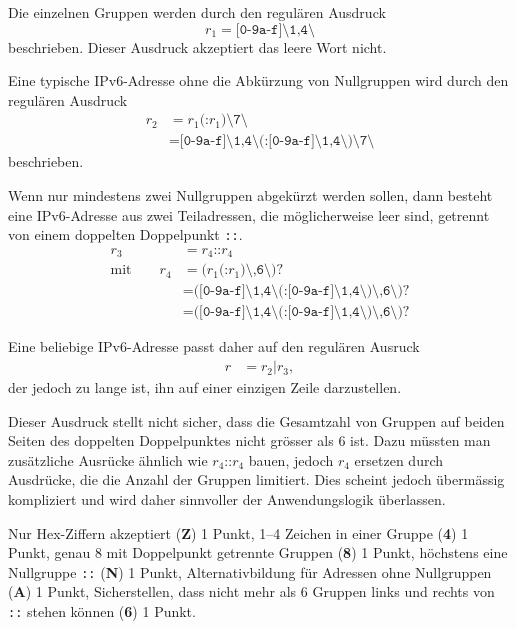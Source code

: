 \begin{loesung}
Die einzelnen Gruppen werden durch den regulären Ausdruck
\[
r_1 = \texttt{[0-9a-f]\char`\{1,4\char`\}}
\]
beschrieben.
Dieser Ausdruck akzeptiert das leere Wort nicht.

Eine typische IPv6-Adresse ohne die Abkürzung von Nullgruppen wird durch
den regulären Ausdruck 
\begin{align*}
r_2
&=
r_1\texttt{(:}r_1\texttt{)\char`\{7\char`\}}
\\
&=
\texttt{[0-9a-f]\char`\{1,4\char`\}}
\texttt{(:}
\texttt{[0-9a-f]\char`\{1,4\char`\}}
\texttt{)\char`\{7\char`\}}
\end{align*}
beschrieben.

Wenn nur mindestens zwei Nullgruppen abgekürzt werden sollen, dann
besteht eine IPv6-Adresse aus zwei Teiladressen, die möglicherweise
leer sind, getrennt von einem doppelten Doppelpunkt \texttt{::}.
\begin{align*}
r_3 &= r_4\texttt{::}r_4
\\
\text{mit}\qquad
r_4
&=
\texttt{(}r_1 \texttt{(:}r_1\texttt{)\char`\{,6\char`\}}\texttt{)?}
\\
&=
\texttt{(}
\texttt{[0-9a-f]\char`\{1,4\char`\}}
\texttt{(:}
\texttt{[0-9a-f]\char`\{1,4\char`\}}
\texttt{)\char`\{,6\char`\}}\texttt{)?}
\\
&=
\texttt{(}
\texttt{[0-9a-f]\char`\{1,4\char`\}}
\texttt{(:}
\texttt{[0-9a-f]\char`\{1,4\char`\}}
\texttt{)\char`\{,6\char`\}}\texttt{)?}
\end{align*}

Eine beliebige IPv6-Adresse passt daher auf den regulären Ausruck
\begin{align*}
r
&=
r_2\texttt{|} r_3,
\end{align*}
der jedoch zu lange ist, ihn auf einer einzigen Zeile darzustellen.

Dieser Ausdruck stellt nicht sicher, dass die Gesamtzahl von Gruppen
auf beiden Seiten des doppelten Doppelpunktes nicht grösser als $6$ ist.
Dazu müssten man zusätzliche Ausrücke ähnlich wie $r_4\texttt{::}r_4$
bauen, jedoch $r_4$ ersetzen durch Ausdrücke, die die Anzahl der Gruppen
limitiert.
Dies scheint jedoch übermässig kompliziert und wird daher sinnvoller
der Anwendungslogik überlassen.
\end{loesung}

\begin{bewertung}
Nur Hex-Ziffern akzeptiert ({\bf Z}) 1 Punkt,
1--4 Zeichen in einer Gruppe ({\bf 4}) 1 Punkt,
genau 8 mit Doppelpunkt getrennte Gruppen ({\bf 8}) 1 Punkt,
höchstens eine Nullgruppe \texttt{::} ({\bf N}) 1 Punkt,
Alternativbildung für Adressen ohne Nullgruppen ({\bf A}) 1 Punkt,
Sicherstellen, dass nicht mehr als 6 Gruppen links und rechts von 
\texttt{::} stehen können ({\bf 6}) 1 Punkt.
\end{bewertung}

